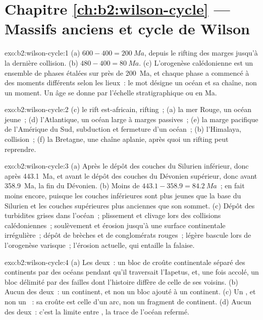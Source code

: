 \section*{Chapitre \ref{ch:b2:wilson-cycle} --- Massifs anciens et cycle de Wilson}

\begin{solution}{exo:b2:wilson-cycle:1}
(a) $600 - 400 = \qty{200}{Ma}$, depuis le rifting des marges jusqu'à la dernière collision.
(b) $480 - 400 = \qty{80}{Ma}$. (c) L'orogenèse calédonienne est un ensemble de phases étalées sur
près de 200~Ma, et chaque phase a commencé à des moments différents selon les lieux~: le mot
désigne un océan et sa chaîne, non un moment. Un âge se donne par l'échelle stratigraphique ou en
Ma.
\end{solution}

\begin{solution}{exo:b2:wilson-cycle:2}
(c) le rift est-africain, rifting~; (a) la mer Rouge, un océan jeune~; (d) l'Atlantique, un océan large
à marges passives~; (e) la marge pacifique de l'Amérique du Sud, subduction et
fermeture d'un océan~; (b) l'Himalaya, collision~; (f) la Bretagne, une chaîne aplanie, après quoi
un rifting peut reprendre.
\end{solution}

\begin{solution}{exo:b2:wilson-cycle:3}
(a) Après le dépôt des couches du Silurien inférieur, donc après \qty{443.1}{Ma}, et avant le
dépôt des couches du Dévonien supérieur, donc avant \qty{358.9}{Ma}, la fin du Dévonien.
(b) Moins de $443.1 - 358.9 = \qty{84.2}{Ma}$~; en fait moins encore, puisque les couches inférieures sont plus
jeunes que la base du Silurien et les couches supérieures plus anciennes que son sommet. (c) Dépôt des
turbidites grises dans l'océan~; plissement et clivage lors des collisions calédoniennes~; soulèvement et
érosion jusqu'à une surface continentale irrégulière~; dépôt de brèches et de conglomérats rouges~; légère
bascule lors de l'orogenèse varisque~; l'érosion actuelle, qui entaille la falaise.
\end{solution}

\begin{solution}{exo:b2:wilson-cycle:4}
(a) Les deux~: un bloc de croûte continentale séparé des continents par des océans pendant
qu'il traversait l'Iapetus, et, une fois accolé, un bloc délimité par des failles dont l'histoire diffère de celle de ses
voisins. (b) Aucun des deux~: un continent, et non un bloc ajouté à un continent. (c) Un , et non un
~: sa croûte est celle d'un arc, non un fragment de continent. (d) Aucun des deux~: c'est
la limite entre , la trace de l'océan refermé.
\end{solution}

